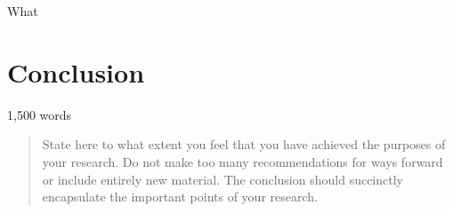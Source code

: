 What \section{Conclusion}
1,500 words 

\begin{quote}
State here to what extent you feel that you have achieved the purposes of your research. Do not make too many recommendations for ways forward or include entirely new material. The conclusion should succinctly encapsulate the important points of your research.
\end{quote}